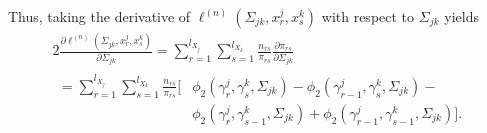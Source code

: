 Thus, taking the derivative of $\ell^{(n)}(\Sigma_{jk}, x^j_r,x^k_s)$ with respect to $\Sigma_{jk}$ yields
\begin{multline*}{2}
        \frac{\partial \ell^{(n)}(\Sigma_{jk}, x^j_r,x^k_s)}{\partial \Sigma_{jk}} = \sum_{r=1}^{l_{X_{j}}}\sum_{s=1}^{l_{X_{k}}} \frac{n_{rs}}{\pi_{rs}} \frac{\partial \pi_{rs}}{\partial \Sigma_{jk}} \\
        \begin{aligned}
        = \sum_{r=1}^{l_{X_{j}}}\sum_{s=1}^{l_{X_{k}}} \frac{n_{rs}}{\pi_{rs}} \Big[&\phi_2({\gamma}^j_r, {\gamma}^k_s, \Sigma_{jk}) - \phi_2({\gamma}^j_{r-1}, {\gamma}^k_s, \Sigma_{jk}) - \\
        &\phi_2({\gamma}^j_r, {\gamma}^k_{s-1}, \Sigma_{jk}) + \phi_2({\gamma}^j_{r-1}, {\gamma}^k_{s-1}, \Sigma_{jk})\Big].
        \end{aligned}
\end{multline*}





